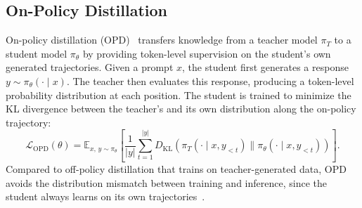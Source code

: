 \documentclass{llmxive}
\providecommand{\expect}{\mathbb{E}}
\begin{document}
\subsection{On-Policy Distillation}
On-policy distillation (OPD)~\cite{agarwal2024gkd, gu2026minillmonpolicydistillationlarge} transfers knowledge from a teacher model $\pi_T$ to a student model $\pi_\theta$ by providing token-level supervision on the student's own generated trajectories. Given a prompt $x$, the student first generates a response $y \sim \pi_\theta(\cdot \mid x)$. The teacher then evaluates this response, producing a token-level probability distribution at each position. The student is trained to minimize the KL divergence between the teacher's and its own distribution along the on-policy trajectory:
\begin{equation}
\label{eq:opd-1}
    \mathcal{L}_{\text{OPD}}(\theta) = \expect_{x,\, y \sim \pi_\theta} \left[ \frac{1}{|y|} \sum_{t=1}^{|y|} D_{\text{KL}}\left( \pi_T(\cdot \mid x, y_{<t}) \| \pi_\theta(\cdot \mid x, y_{<t}) \right) \right].
\end{equation}
Compared to off-policy distillation that trains on teacher-generated data, OPD avoids the distribution mismatch between training and inference, since the student always learns on its own trajectories~\cite{lu2025onpolicy-opd}.
\end{document}
